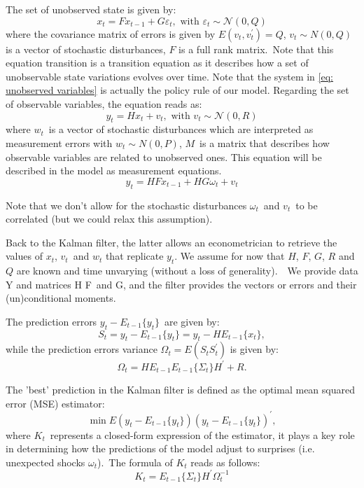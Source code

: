 \documentclass[a4paper,12pt]{article}%
\begin{document}
The set of unobserved state is given by:%
\begin{equation}
x_{t}=Fx_{t-1}+G\varepsilon_{t},\text{ with }\varepsilon_{t}\sim
\mathcal{N}(0,Q) \label{eq: unobserved variables}%
\end{equation}
where the covariance matrix of errors is given by $E(v_{t},v_{t}^{\prime})=Q$,
$v_{t}\sim N(0,Q)$ is a vector of stochastic disturbances, $F$ is a full rank
matrix.\ Note that this equation transition is a transition equation as it
describes how a set of unobservable state variations evolves over time. Note
that the system in \autoref{eq: unobserved variables} is actually the policy
rule of our model. Regarding the set of observable variables, the equation
reads as:
\begin{equation}
y_{t}=Hx_{t}+v_{t},\text{ with }v_{t}\sim\mathcal{N}(0,R)
\label{eq: observed variables}%
\end{equation}
where $w_{t}$\ is a vector of stochastic disturbances which are interpreted as
measurement errors with $w_{t}\sim N(0,P)$, $M$\ is a matrix that describes
how observable variables are related to unobserved ones. This equation will be
described in the model as \textsf{measurement equations}.%
\begin{equation}
y_{t}=HFx_{t-1}+HG\omega_{t}+v_{t}%
\end{equation}


Note that we don't allow for the stochastic disturbances $\omega_{t}$\ and
$v_{t}$\ to be correlated (but we could relax this assumption).

Back to the Kalman filter, the latter allows an econometrician to retrieve the
values of $x_{t}$, $v_{t}$\ and $w_{t}$ that replicate $y_{t}$. We assume for
now that $H$, $F$, $G$, $R$ and $Q$ are known and time unvarying (without a
loss of generality).\ \ We provide data Y and matrices H F\ and G, and the
filter provides the vectors or errors and their (un)conditional moments.

The prediction errors $y_{t}-E_{t-1}\{y_{t}\}$\ are given by:%
\begin{equation}
S_{t}=y_{t}-E_{t-1}\{y_{t}\}=y_{t}-HE_{t-1}\{x_{t}\}, \label{eq KF1}%
\end{equation}
while the prediction errors variance $\Omega_{t}=E\left(  S_{t}S_{t}^{\prime
}\right)  $ is given by:
\begin{equation}
\Omega_{t}=HE_{t-1}E_{t-1}\{\Sigma_{t}\}H^{\prime}+R. \label{eq KF2}%
\end{equation}


The 'best' prediction in the Kalman filter is defined as the optimal mean
squared error (MSE) estimator:
\[
\min E\left(  y_{t}-E_{t-1}\{y_{t}\}\right)  \left(  y_{t}-E_{t-1}%
\{y_{t}\}\right)  ^{\prime},
\]
where $K_{t}$\ represents a closed-form expression of the estimator, it plays
a key role in determining how the predictions of the model adjust to surprises
(i.e. unexpected shocks $\omega_{t}$).\ The formula of $K_{t}$ reads as
follows:%
\begin{equation}
K_{t}=E_{t-1}\{\Sigma_{t}\}H^{\prime}\Omega_{t}^{-1} \label{eq KF3}%
\end{equation}
\end{document}
